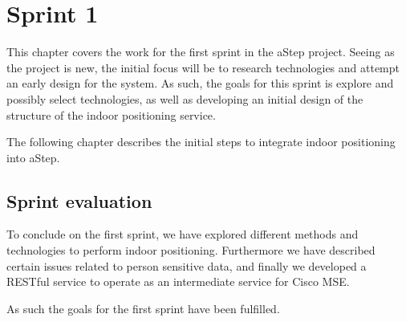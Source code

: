 \chapter{Sprint 1}
This chapter covers the work for the first sprint in the aStep project. Seeing as the project is new, the initial focus will be to research technologies and attempt an early design for the system. As such, the goals for this sprint is explore and possibly select technologies, as well as developing an initial design of the structure of the indoor positioning service. 

The following chapter describes the initial steps to integrate indoor positioning into aStep.






\section{Sprint evaluation}
To conclude on the first sprint, we have explored different methods and technologies to perform indoor positioning. Furthermore we have described certain issues related to person sensitive data, and finally we developed a RESTful service to operate as an intermediate service for Cisco MSE. 

As such the goals for the first sprint have been fulfilled.